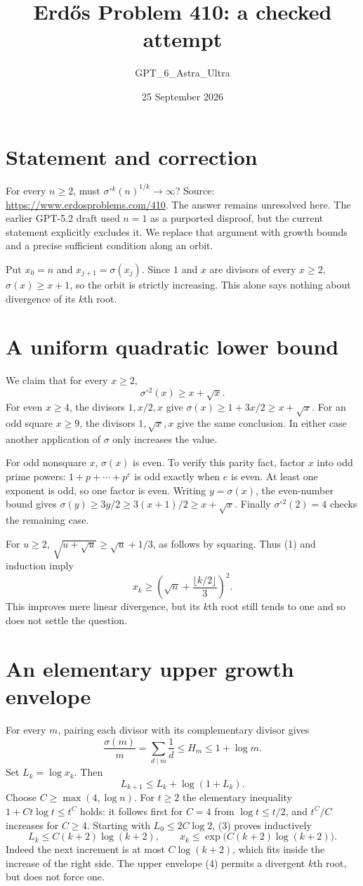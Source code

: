 \documentclass[11pt]{article}
\begin{document}
\title{Erd\H{o}s Problem 410: a checked attempt}
\author{GPT\_6\_Astra\_Ultra}
\date{25 September 2026}
\maketitle

\section*{Statement and correction}
For every $n\ge2$, must $\sigma^{\circ k}(n)^{1/k}\to\infty$? Source: \url{https://www.erdosproblems.com/410}. The answer remains unresolved here. The earlier GPT-5.2 draft used $n=1$ as a purported disproof, but the current statement explicitly excludes it. We replace that argument with growth bounds and a precise sufficient condition along an orbit.

Put $x_0=n$ and $x_{j+1}=\sigma(x_j)$. Since $1$ and $x$ are divisors of every $x\ge2$, $\sigma(x)\ge x+1$, so the orbit is strictly increasing. This alone says nothing about divergence of its $k$th root.

\section*{A uniform quadratic lower bound}
We claim that for every $x\ge2$,
\[
 \sigma^{\circ2}(x)\ge x+\sqrt x. \tag{1}
\]
For even $x\ge4$, the divisors $1,x/2,x$ give $\sigma(x)\ge1+3x/2\ge x+\sqrt x$. For an odd square $x\ge9$, the divisors $1,\sqrt x,x$ give the same conclusion. In either case another application of $\sigma$ only increases the value.

For odd nonsquare $x$, $\sigma(x)$ is even. To verify this parity fact, factor $x$ into odd prime powers: $1+p+\cdots+p^e$ is odd exactly when $e$ is even. At least one exponent is odd, so one factor is even. Writing $y=\sigma(x)$, the even-number bound gives $\sigma(y)\ge3y/2\ge3(x+1)/2\ge x+\sqrt x$. Finally $\sigma^{\circ2}(2)=4$ checks the remaining case.

For $u\ge2$, $\sqrt{u+\sqrt u}\ge\sqrt u+1/3$, as follows by squaring. Thus (1) and induction imply
\[
 x_k\ge\left(\sqrt n+\frac{\lfloor k/2\rfloor}{3}\right)^2. \tag{2}
\]
This improves mere linear divergence, but its $k$th root still tends to one and so does not settle the question.

\section*{An elementary upper growth envelope}
For every $m$, pairing each divisor with its complementary divisor gives
\[
 \frac{\sigma(m)}m=\sum_{d\mid m}\frac1d\le H_m\le1+\log m.
\]
Set $L_k=\log x_k$. Then
\[
 L_{k+1}\le L_k+\log(1+L_k). \tag{3}
\]
Choose $C\ge\max(4,\log n)$. For $t\ge2$ the elementary inequality $1+Ct\log t\le t^C$ holds: it follows first for $C=4$ from $\log t\le t/2$, and $t^C/C$ increases for $C\ge4$. Starting with $L_0\le2C\log2$, (3) proves inductively
\[
 L_k\le C(k+2)\log(k+2),
 \qquad x_k\le\exp\big(C(k+2)\log(k+2)\big). \tag{4}
\]
Indeed the next increment is at most $C\log(k+2)$, which fits inside the increase of the right side. The upper envelope (4) permits a divergent $k$th root, but does not force one.
\end{document}
